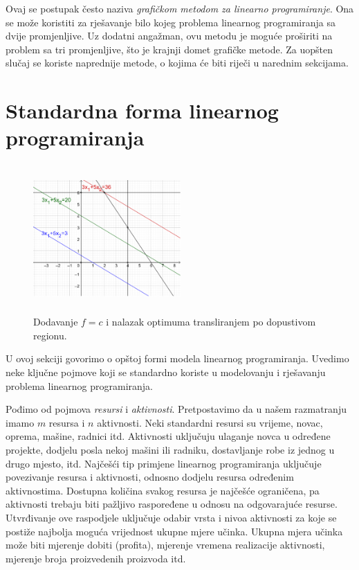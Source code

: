 \documentclass[a4paper, utf8, 11pt, colorlinks]{book}
\theoremstyle{definition}
\begin{document}
Ovaj se postupak često naziva \emph{grafičkom metodom za linearno programiranje}. Ona se može koristiti za rješavanje bilo kojeg problema linearnog programiranja sa dvije promjenljive. Uz dodatni angažman,  ovu metodu je moguće   proširiti na problem sa tri promjenljive, što je krajnji domet grafičke metode. Za uopšten slučaj se koriste naprednije metode,  o kojima će biti riječi u narednim sekcijama.

\section{Standardna forma linearnog programiranja}

\begin{figure}[!ht]
    \centering
    \includegraphics[width=160pt, height=160pt]{fig2.eps}
    \caption{Dodavanje $f = c$ i nalazak optimuma transliranjem po dopustivom regionu.}
    \label{fig:fig2}
\end{figure}

U ovoj sekciji govorimo o opštoj formi modela linearnog programiranja. Uvedimo neke ključne pojmove koji se standardno koriste u modelovanju i rješavanju problema linearnog programiranja. 

Pođimo od pojmova \textit{resursi} i \textit{aktivnosti}. Pretpostavimo da u našem razmatranju imamo $m$ resursa i $n$ aktivnosti. Neki standardni resursi su vrijeme, novac, oprema, mašine, radnici itd. Aktivnosti uključuju ulaganje novca u određene projekte, dodjelu posla nekoj mašini ili radniku,  dostavljanje robe iz jednog u drugo mjesto, itd. 
 Najčešći tip primjene linearnog programiranja uključuje povezivanje resursa i aktivnosti, odnosno dodjelu resursa određenim aktivnostima. Dostupna količina svakog resursa je najčešće ograničena, pa aktivnosti trebaju biti pažljivo raspoređene u odnosu na odgovarajuće resurse.  Utvrđivanje ove raspodjele uključuje odabir vrsta i nivoa aktivnosti za koje se postiže najbolja moguća vrijednost ukupne mjere učinka. Ukupna mjera učinka može biti mjerenje dobiti (profita), mjerenje vremena realizacije aktivnosti, mjerenje broja proizvedenih proizvoda itd.
\end{document}
